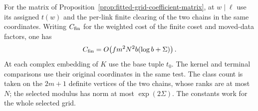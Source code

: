 \begin{proposition}\label{prop:fitted-grid-constituent-costs}
For the matrix of Proposition~\ref{prop:fitted-grid-coefficient-matrix},
at \(w\mid\ell\) use its assigned \(t(w)\) and the per-link
finite clearing of the two chains in the same coordinates.
Writing \(C_{\rm fin}\) for the weighted cost of the finite coset and moved-data factors, one has
\[
 C_{\rm fin}=O\!\left(fm^2N^2b(\log b+\Sigma)\right).
\]
 At each complex embedding of \(K\) use the base tuple \(t_0\).
The kernel and terminal comparisons use their original
coordinates in the same test. The class count is taken on the
\(2m+1\) definite vertices of the two chains, whose ranks are
at most \(N\); the selected modulus has norm at most
\(\exp(2\Sigma)\). The constants work for the whole selected grid.
\end{proposition}


